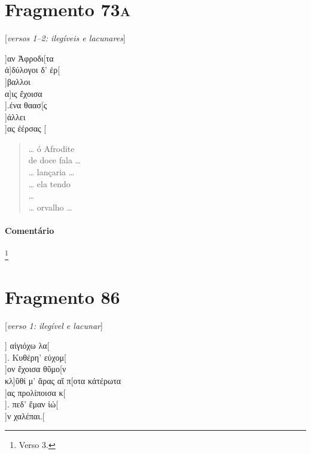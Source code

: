 \section{Fragmento 73\textsc{a}} 

\begin{gkverse}
\textnormal{[\emph{versos 1--2: ilegíveis e lacunares}]}

]αν Ἀφροδι[τα\\
          ἀ]δύλογοι δ’ ἐρ[\\
        ]βαλλοι\\
      α]ις ἔχοισα\\
     ].ένα θαασ[ς\\
     ]άλλει\\
     ]ας ἐέρσας [

\end{gkverse}

\begin{verse}
\ldots{} ó Afrodite\\
de doce fala \ldots{}\\
\ldots{} lançaria \ldots{}\\
\ldots{} ela tendo\\
\ldots{}\\
\ldots{} orvalho \ldots{}\\
\end{verse}

\medskip

\paragraph{Comentário} \footnote{Verso 3.} 



\section{Fragmento 86}

\begin{gkverse}
\textnormal{[\emph{verso 1: ilegível e lacunar}]}

] αἰγιόχω λα[\\
]. Κυθέρη’ εὐχομ[\\
  ]ον ἔχοισα θῦμο[ν\\
κλ]ῦθί μ’ ἄρας αἴ π[οτα κἀτέρωτα\\
    ]ας προλίποισα κ[\\
    ]. πεδ’ ἔμαν ἰώ[\\
        ]ν χαλέπαι.[

\end{gkverse}

